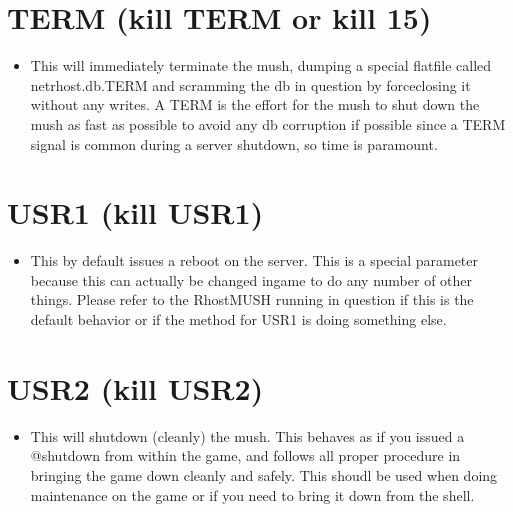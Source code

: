 \documentclass[letterpaper,10pt,english]{sphinxmanual}
\begin{document}
\section{TERM (kill \sphinxhyphen{}TERM or kill \sphinxhyphen{}15)}
\label{\detokenize{13-signals:term-kill-term-or-kill-15}}\begin{itemize}
\item {} 
\sphinxAtStartPar
This will immediately terminate the mush, dumping a special flatfile called
netrhost.db.TERM and scramming the db in question by force\sphinxhyphen{}closing it
without any writes.  A TERM is the effort for the mush to shut down the
mush as fast as possible to avoid any db corruption if possible since
a TERM signal is common during a server shutdown, so time is paramount.

\end{itemize}


\section{USR1 (kill \sphinxhyphen{}USR1)}
\label{\detokenize{13-signals:usr1-kill-usr1}}\begin{itemize}
\item {} 
\sphinxAtStartPar
This by default issues a reboot on the server.  This is a special parameter
because this can actually be changed in\sphinxhyphen{}game to do any number of other
things.  Please refer to the RhostMUSH running in question if this is
the default behavior or if the method for USR1 is doing something else.

\end{itemize}


\section{USR2 (kill \sphinxhyphen{}USR2)}
\label{\detokenize{13-signals:usr2-kill-usr2}}\begin{itemize}
\item {} 
\sphinxAtStartPar
This will shutdown (cleanly) the mush.  This behaves as if you issued
a @shutdown from within the game, and follows all proper procedure
in bringing the game down cleanly and safely.  This shoudl be used
when doing maintenance on the game or if you need to bring it down
from the shell.

\end{itemize}
\end{document}
